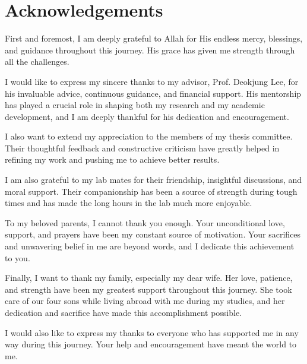 \section*{\hfill \Large Acknowledgements \hfill}
First and foremost, I am deeply grateful to Allah for His endless mercy, blessings, and guidance throughout this journey. His grace has given me strength through all the challenges.

I would like to express my sincere thanks to my advisor, Prof. Deokjung Lee, for his invaluable advice, continuous guidance, and financial support. His mentorship has played a crucial role in shaping both my research and my academic development, and I am deeply thankful for his dedication and encouragement.

I also want to extend my appreciation to the members of my thesis committee. Their thoughtful feedback and constructive criticism have greatly helped in refining my work and pushing me to achieve better results.

I am also grateful to my lab mates for their friendship, insightful discussions, and moral support. Their companionship has been a source of strength during tough times and has made the long hours in the lab much more enjoyable.

To my beloved parents, I cannot thank you enough. Your unconditional love, support, and prayers have been my constant source of motivation. Your sacrifices and unwavering belief in me are beyond words, and I dedicate this achievement to you.

Finally, I want to thank my family, especially my dear wife. Her love, patience, and strength have been my greatest support throughout this journey. She took care of our four sons while living abroad with me during my studies, and her dedication and sacrifice have made this accomplishment possible.

I would also like to express my thanks to everyone who has supported me in any way during this journey. Your help and encouragement have meant the world to me.
\clearpage